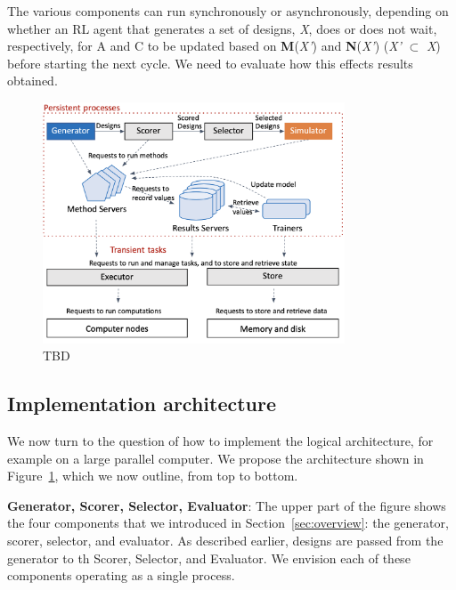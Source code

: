 \documentclass[10pt]{article}
\begin{document}
The various components can run synchronously or asynchronously, depending on whether an RL agent that generates a set of designs, \emph{X}, does or does not wait, respectively, for A and C to be updated based on \textbf{M}(\emph{X’}) and \textbf{N}(\emph{X’}) (\emph{X’} $\subset$ \emph{X})  before starting the next cycle. We need to evaluate how this effects results obtained.



\begin{figure}
  \centering
  \includegraphics[width=0.8\textwidth,trim=0in 0in 0in 0in,clip]{./Figs/arch.png}
  \vspace{-1.5ex}
  \caption{TBD}
\label{fig:arch}
\end{figure}

\subsection{Implementation architecture}

We now turn to the question of how to implement the logical architecture, for example on a large parallel computer. 
We propose the architecture shown in Figure~\ref{fig:arch}, which we now outline, from top to bottom.

\textbf{Generator, Scorer, Selector, Evaluator}: The upper part of the figure shows the four components that we introduced in Section~\ref{sec:overview}:
the generator, scorer, selector, and evaluator. 
As described earlier, designs are passed from the generator to th Scorer, Selector, and Evaluator.
We envision each of these components operating as a single process.
\end{document}
